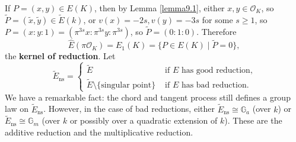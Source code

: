 \documentclass{article}
\theoremstyle{definition}
\begin{document}
If $P=(x,y) \in E(K)$, then by Lemma \ref{lemma9.1}, either $x, y \in \mathcal{O}_K$, so $\widetilde{P}=(\widetilde{x},\widetilde{y}) \in \widetilde{E}(k)$, or $v(x)=-2s,v(y)=-3s$ for some $s\ge 1$, so $P=(x:y:1) = (\pi^{3s}x : \pi^{3s}y : \pi^{3s})$, so $\widetilde{P} = (0:1:0)$. Therefore \[
\widehat{E}(\pi \mathcal{O}_K) = E_1(K) = \{P \in E(K) \mid  \widetilde{P} = 0\},
\]
the \textbf{kernel of reduction}. Let \[
\widetilde{E}_{\text{ns}} = \begin{cases}
    \widetilde{E} & \text{ if }E \text{ has good reduction,}\\
    \widetilde{E}\setminus \{\text{singular point}\} & \text{ if }E \text{ has bad reduction.}
\end{cases}
\]
We have a remarkable fact: the chord and tangent process still defines a group law on $\widetilde{E}_{\text{ns}}$. However, in the case of bad reductions, either $\widetilde{E}_{\text{ns}} \cong \mathbb{G}_a$ (over $k$) or $\widetilde{E}_{\text{ns}} \cong \mathbb{G}_m$ (over $k$ or possibly over a quadratic extension of $k$). These are the additive reduction and the multiplicative reduction.
\vspace{1mm}
 
\end{document}
